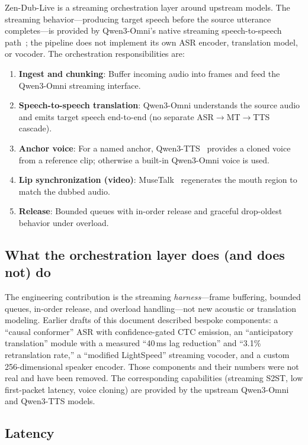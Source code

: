 \documentclass[11pt,a4paper]{article}
\begin{document}
Zen-Dub-Live is a streaming orchestration layer around upstream models. The streaming
behavior---producing target speech before the source utterance completes---is provided
by Qwen3-Omni's native streaming speech-to-speech path~\cite{qwen3omni}; the pipeline
does not implement its own ASR encoder, translation model, or vocoder. The
orchestration responsibilities are:

\begin{enumerate}
  \item \textbf{Ingest and chunking}: Buffer incoming audio into frames and feed the
        Qwen3-Omni streaming interface.
  \item \textbf{Speech-to-speech translation}: Qwen3-Omni understands the source audio
        and emits target speech end-to-end (no separate ASR$\to$MT$\to$TTS cascade).
  \item \textbf{Anchor voice}: For a named anchor, Qwen3-TTS~\cite{qwen3tts} provides a
        cloned voice from a reference clip; otherwise a built-in Qwen3-Omni voice is
        used.
  \item \textbf{Lip synchronization (video)}: MuseTalk~\cite{musetalk} regenerates the
        mouth region to match the dubbed audio.
  \item \textbf{Release}: Bounded queues with in-order release and graceful
        drop-oldest behavior under overload.
\end{enumerate}

\subsection{What the orchestration layer does (and does not) do}

The engineering contribution is the streaming \emph{harness}---frame buffering,
bounded queues, in-order release, and overload handling---not new acoustic or
translation modeling. Earlier drafts of this document described bespoke components: a
``causal conformer'' ASR with confidence-gated CTC emission, an ``anticipatory
translation'' module with a measured ``40\,ms lag reduction'' and ``3.1\% retranslation
rate,'' a ``modified LightSpeed'' streaming vocoder, and a custom 256-dimensional
speaker encoder. Those components and their numbers were not real and have been
removed. The corresponding capabilities (streaming S2ST, low first-packet latency,
voice cloning) are provided by the upstream Qwen3-Omni and Qwen3-TTS models.

\subsection{Latency}
\end{document}
